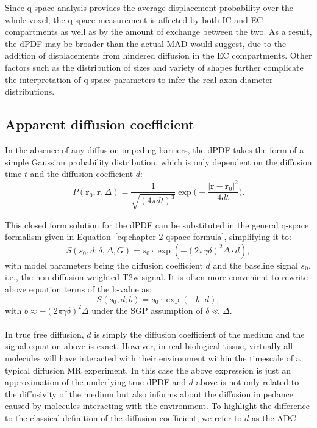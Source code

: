Since q-space analysis provides the average displacement probability over the whole voxel, the q-space measurement is affected by both IC and EC compartments as well as by the amount of exchange between the two. As a result, the \gls{dPDF} may be broader than the actual \gls{MAD} would suggest, due to the addition of displacements from hindered diffusion in the EC compartments. Other factors such as the distribution of sizes and variety of shapes further complicate the interpretation of q-space parameters to infer the real axon diameter distributions. 


\subsection{Apparent diffusion coefficient}
\label{subsec:adc}
In the absence of any diffusion impeding barriers, the \gls{dPDF} takes the form of a simple Gaussian probability distribution, which is only dependent on the diffusion time $t$ and the diffusion coefficient $d$:
\begin{equation}
P(\textbf{r}_{0},\textbf{r},\Delta) =  \frac{1}{\sqrt{(4\pi dt)^3}}\exp\bigg(-\frac{|\textbf{r}-\textbf{r}_{0}|^{2}}{4dt}\bigg).
\label{Gaussian PDF}
\end{equation}

This closed form solution for the \gls{dPDF} can be substituted in the general q-space formalism given in Equation~\ref{eq:chapter 2 qspace formula}, simplifying it to:
\begin{equation}
	S(s_0,d;\delta,\Delta,G) = s_0 \cdot \exp(-(2\pi\gamma\delta)^2\Delta \cdot d),
\end{equation}
with model parameters being the diffusion coefficient $d$ and the baseline signal $s_0$, i.e., the non-diffusion weighted T2w signal. It is often more convenient to rewrite above equation terms of the b-value as: 
\begin{equation}
	S(s_0,d;b) = s_0 \cdot \exp(-b \cdot d),
\end{equation}
with $b  \approx -(2\pi\gamma\delta)^2\Delta$ under the \gls{SGP} assumption of $\delta \ll \Delta$.
\paragraph{}
In true free diffusion, $d$ is simply the diffusion coefficient of the medium and the signal equation above is exact. However, in real biological tissue, virtually all molecules will have interacted with their environment within the timescale of a typical diffusion MR experiment. In this case the above expression is just an approximation of the underlying true \gls{dPDF} and $d$ above is not only related to the diffusivity of the medium but also informs about the diffusion impedance caused by molecules interacting with the environment. To highlight the difference to the classical definition of the diffusion coefficient, we refer to $d$ as the \gls{ADC}.

